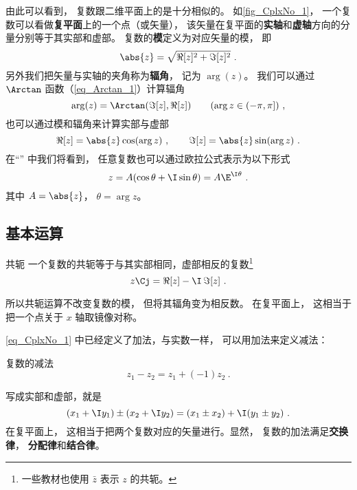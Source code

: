 由此可以看到， 复数跟二维平面上的是十分相似的。 如\autoref{fig_CplxNo_1}， 一个复数可以看做\textbf{复平面}上的一个点（或矢量）， 该矢量在复平面的\textbf{实轴}和\textbf{虚轴}方向的分量分别等于其实部和虚部。 复数的\textbf{模}定义为对应矢量的模， 即
\begin{equation}
\abs{z} = \sqrt{\Re[z]^2 + \Im[z]^2}~.
\end{equation}
另外我们把矢量与实轴的夹角称为\textbf{辐角}， 记为 $\arg(z)$。 我们可以通过 $\Arctan$ 函数（\autoref{eq_Arctan_1}）计算辐角
\begin{equation}\label{eq_CplxNo_5}
\arg(z) = \Arctan(\Im[z], \Re[z])
\qquad (\arg z \in (-\pi, \pi])~,
\end{equation}
也可以通过模和辐角来计算实部与虚部
\begin{equation}
\Re[z] = \abs{z}\cos(\arg z)~, \qquad \Im[z] = \abs{z}\sin(\arg z)~.
\end{equation}
在“” 中我们将看到， 任意复数也可以通过欧拉公式表示为以下形式
\begin{equation}
z = A(\cos\theta + \I\sin\theta) = A\E^{\I\theta}~.
\end{equation}
其中 $A = \abs{z}$， $\theta = \arg z$。

\subsection{基本运算}
\begin{definition}{共轭}
一个复数的共轭等于与其实部相同，虚部相反的复数\footnote{一些教材也使用 $\bar z$ 表示 $z$ 的共轭。}
\begin{equation}\label{eq_CplxNo_6}
z\Cj = \Re[z] - \I\, \Im[z]~.
\end{equation}
\end{definition}
所以共轭运算不改变复数的模， 但将其辐角变为相反数。 在复平面上， 这相当于把一个点关于 $x$ 轴取镜像对称。

\autoref{eq_CplxNo_1} 中已经定义了加法，与实数一样， 可以用加法来定义减法：
\begin{definition}{复数的减法}
\begin{equation}
z_1 - z_2 = z_1 + (-1)z_2~.
\end{equation}
\end{definition}
写成实部和虚部，就是
\begin{equation}
(x_1 + \I y_1) \pm (x_2 + \I y_2) = (x_1 \pm x_2) + \I (y_1 \pm y_2)~.
\end{equation}
在复平面上， 这相当于把两个复数对应的矢量进行。显然， 复数的加法满足\textbf{交换律}， \textbf{分配律}和\textbf{结合律}。

